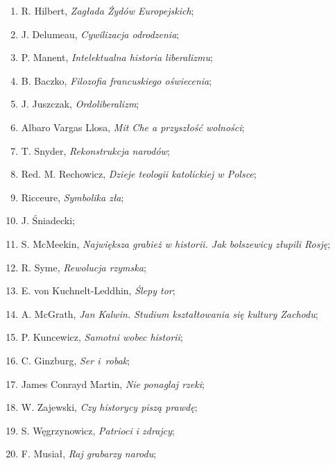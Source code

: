 \documentclass[a4paper,11pt]{article}
\begin{document}
\begin{enumerate}
\item R. Hilbert, \textit{Zagłada Żydów Europejskich};

\item J. Delumeau, \textit{Cywilizacja odrodzenia};

\item P. Manent, \textit{Intelektualna historia liberalizmu};

\item B. Baczko, \textit{Filozofia francuskiego oświecenia};

\item J. Juszczak, \textit{Ordoliberalizm};

\item Albaro Vargas Llosa, \textit{Mit Che a przyszłość wolności};

\item T. Snyder, \textit{Rekonstrukcja narodów};

\item Red. M. Rechowicz, \textit{Dzieje teologii katolickiej w Polsce};

\item Ricceure, \textit{Symbolika zła};

\item J. Śniadecki;

\item S. McMeekin, \textit{Największa grabież w historii. Jak bolszewicy
    złupili Rosję};

\item R. Syme, \textit{Rewolucja rzymska};

\item E. von Kuchnelt-Leddhin, \textit{Ślepy tor};

\item A. McGrath, \textit{Jan Kalwin. Studium kształtowania się kultury
    Zachodu};

\item P. Kuncewicz, \textit{Samotni wobec historii};

\item C. Ginzburg, \textit{Ser i~robak};

\item James Conrayd Martin, \textit{Nie ponaglaj rzeki};

\item W. Zajewski, \textit{Czy historycy piszą prawdę};

\item S. Węgrzynowicz, \textit{Patrioci i zdrajcy};

\item F. Musiał, \textit{Raj grabarzy narodu};


\end{enumerate}
\end{document}
